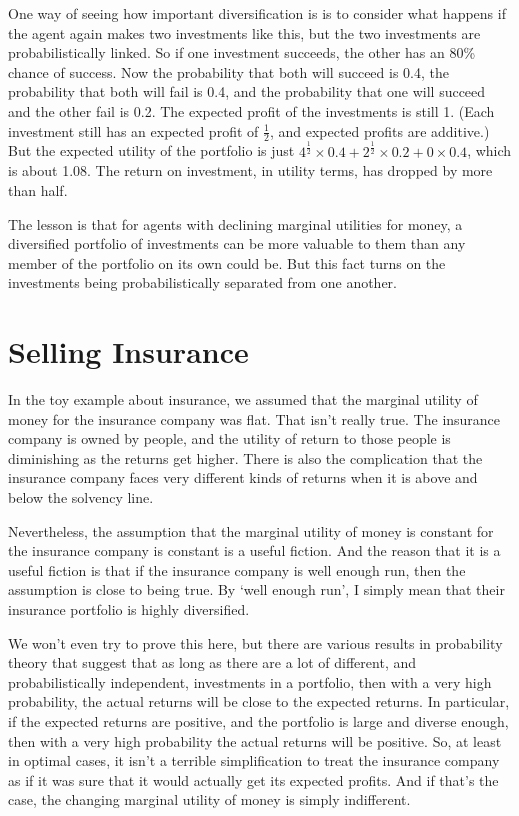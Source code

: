 One way of seeing how important diversification is is to consider what happens if the agent again makes two investments like this, but the two investments are probabilistically linked. So if one investment succeeds, the other has an 80\% chance of success. Now the probability that both will succeed is 0.4, the probability that both will fail is 0.4, and the probability that one will succeed and the other fail is 0.2. The expected profit of the investments is still 1. (Each investment still has an expected profit of $\frac{1}{2}$, and expected profits are additive.) But the expected utility of the portfolio is just $4^{\frac{1}{2}} \times 0.4 + 2^{\frac{1}{2}} \times 0.2 + 0 \times 0.4$, which is about 1.08. The return on investment, in utility terms, has dropped by more than half.

The lesson is that for agents with declining marginal utilities for money, a diversified portfolio of investments can be more valuable to them than any member of the portfolio on its own could be. But this fact turns on the investments being probabilistically separated from one another.

\section{Selling Insurance}
In the toy example about insurance, we assumed that the marginal utility of money for the insurance company was flat. That isn't really true. The insurance company is owned by people, and the utility of return to those people is diminishing as the returns get higher. There is also the complication that the insurance company faces very different kinds of returns when it is above and below the solvency line.

Nevertheless, the assumption that the marginal utility of money is constant for the insurance company is constant is a useful fiction. And the reason that it is a useful fiction is that if the insurance company is well enough run, then the assumption is close to being true. By `well enough run', I simply mean that their insurance portfolio is highly diversified.

We won't even try to prove this here, but there are various results in probability theory that suggest that as long as there are a lot of different, and probabilistically independent, investments in a portfolio, then with a very high probability, the actual returns will be close to the expected returns. In particular, if the expected returns are positive, and the portfolio is large and diverse enough, then with a very high probability the actual returns will be positive. So, at least in optimal cases, it isn't a terrible simplification to treat the insurance company as if it was sure that it would actually get its expected profits. And if that's the case, the changing marginal utility of money is simply indifferent.


